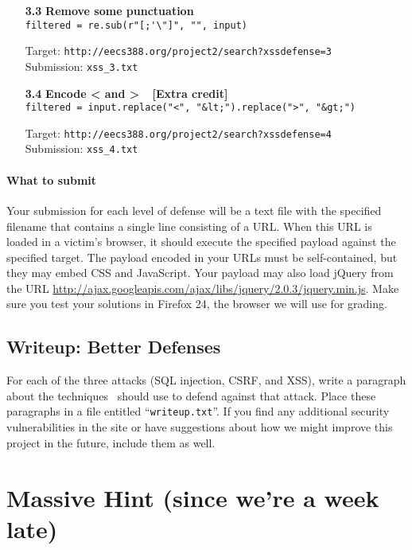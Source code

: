 \documentclass[letterpaper,12pt]{article}
\begin{document}
{\begin{enumerate}
\item[\bf 3.3] \textbf{Remove some punctuation}\\
\verb+filtered = re.sub(r"[;'\"]", "", input)+
\smallskip

Target: \texttt{http://eecs388.org/project2/search?xssdefense=3}\\
Submission: \texttt{xss\_3.txt}

\item[\bf 3.4] \textbf{Encode < and >\ \ [Extra credit]}\\
\verb+filtered = input.replace("<", "&lt;").replace(">", "&gt;")+
\smallskip

Target: \texttt{http://eecs388.org/project2/search?xssdefense=4}\\
Submission: \texttt{xss\_4.txt}

\end{enumerate}

\paragraph{What to submit}
Your submission for each level of defense will be a text file with the specified filename that contains a single line consisting of a URL.  When this URL is loaded in a victim's browser, it should execute the specified payload against the specified target. The payload encoded in your URLs must be self-contained, but they may embed CSS and JavaScript.  Your payload may also load jQuery from the URL \url{http://ajax.googleapis.com/ajax/libs/jquery/2.0.3/jquery.min.js}.  Make sure you test your solutions in Firefox 24, the browser we will use for grading.

\subsection{Writeup: Better Defenses}
For each of the three attacks (SQL injection, CSRF, and XSS), write a paragraph about the techniques \bungle\ should use to defend against that attack. Place these paragraphs in a file entitled ``\texttt{writeup.txt}''. If you find any additional security vulnerabilities in the site or have suggestions about how we might improve this project in the future, include them as well. 
\fi

\newpage
\section*{Massive Hint (since we're a week late)}

}
\end{document}
